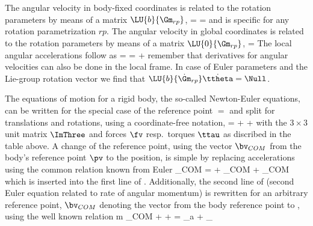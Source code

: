     The angular velocity in body-fixed coordinates is related to the rotation parameters by means of a matrix $\LU{b}{\Gm_{rp}}$,
    \be \label{eq:ObjectRigidBody:omegaLocal}
       =  \dot \ttheta =  \dot \tpsi \eqComma
    \ee
    and is specific for any rotation parametrization $rp$.
    The angular velocity in global coordinates is related to the rotation parameters by means of a matrix $\LU{0}{\Gm_{rp}}$,
    \be \label{eq:ObjectRigidBody:omega}
       =  \dot \ttheta\eqDot
    \ee
    The local angular accelerations follow as
    \be \label{eq:ObjectRigidBody:alpha}
       = =  \ddot \ttheta +  \dot \ttheta \eqComma
    \ee
    remember that derivatives for angular velocities can also be done in the local frame. In case of Euler parameters and the Lie-group rotation vector we find that
    $\LU{b}{\dot \Gm_{rp}} \dot \ttheta = \Null$.
    
    The equations of motion for a rigid body, the so-called Newton-Euler equations, can be written for the special case of the reference point $=$  and split for translations and rotations, using a coordinate-free notation,
    \be \label{eq:ObjectRigidBody:EOMcom0}
        = \vp{\Null}{-\tilde \tomega \Jm \tomega} +  + \vp{\fv_\lambda}{\ttau_\lambda}
    \ee
    with the $3\times 3$ unit matrix $\ImThree$ and forces $\fv$ resp.\ torques $\ttau$ as discribed in the table above.
    A change of the reference point, using the vector $\bv_{COM}$ from the body's reference point $\pv$ to the  position, is simple by replacing  accelerations using the common relation known from Euler
    \be
      \av_{COM} =  \av + \tilde \talpha \bv_{COM} + \tilde \tomega \tilde \tomega \bv_{COM} \eqComma
    \ee
    which is inserted into the first line of . Additionally, the second line of 
    (second Euler equation related to rate of angular momentum) is rewritten for an arbitrary reference point, $\bv_{COM}$ denoting the vector from the body reference point to , using the well known relation
    \be
      m \tilde \bv_{COM} \talpha +  \Jm \talpha + \tilde \tomega \Jm \tomega = \ttau_a + \ttau_\lambda
    \ee
    
